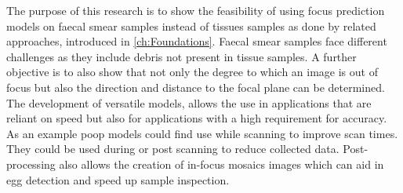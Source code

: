 The purpose of this research is to show the feasibility of using focus prediction models on faecal smear samples instead of tissues samples as done by related approaches, introduced in \autoref{ch:Foundations}. Faecal smear samples face different challenges as they include debris not present in tissue samples.
A further objective is to also show that not only the degree to which an image is out of focus but also the direction and distance to the focal plane can be determined. The development of versatile models, allows the use in applications that are reliant on speed but also for applications with a high requirement for accuracy. As an example \ac{poop} models could find use while scanning to improve scan times. They could be used during or post scanning to reduce collected data. Post-processing also allows the creation of in-focus mosaics images which can aid in egg detection and speed up sample inspection.
